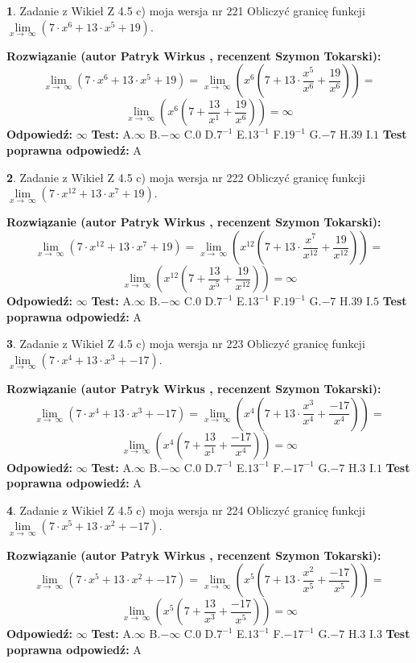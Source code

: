 \documentclass[12pt, a4paper]{article}
\theoremstyle{definition} %
\newtheorem{zad}{}
\newcommand{\zadStart}[1]{\begin{zad}#1\newline}
\newcommand{\zadStop}{\end{zad}}
\newcommand{\rozwStart}[2]{\noindent \textbf{Rozwiązanie (autor #1 , recenzent #2): }\newline}
\newcommand{\rozwStop}{\newline}
\newcommand{\odpStart}{\noindent \textbf{Odpowiedź:}\newline}
\newcommand{\odpStop}{\newline}
\newcommand{\testStart}{\noindent \textbf{Test:}\newline}
\newcommand{\testStop}{\newline}
\newcommand{\kluczStart}{\noindent \textbf{Test poprawna odpowiedź:}\newline}
\newcommand{\kluczStop}{\newline}
\begin{document}
\zadStart{Zadanie z Wikieł Z 4.5 c) moja wersja nr 221}
Obliczyć granicę funkcji  $\lim\limits_{x\to\ \infty}(7 \cdot x^{6}+13 \cdot x^{5}+19)$.
\zadStop
\rozwStart{Patryk Wirkus}{Szymon Tokarski}
$$\lim\limits_{x\to\ \infty}(7 \cdot x^{6}+13 \cdot x^{5}+19) = \lim\limits_{x\to\ \infty}(x^{6}(7 +13 \cdot \frac{x^{5}}{x^{6}}+\frac{19}{x^{6}})) =$$ $$\lim\limits_{x\to\ \infty}(x^{6}(7 +\frac{13}{x^{1}}+\frac{19}{x^{6}})) =\infty$$
\rozwStop
\odpStart
$\infty$
\odpStop
\testStart
A.$\infty$ B.$-\infty$ C.$0$ D.$7^{-1}$ E.$13^{-1}$
F.$19^{-1}$ G.$-7$
H.$39$
I.$1$
\testStop
\kluczStart
A
\kluczStop



\zadStart{Zadanie z Wikieł Z 4.5 c) moja wersja nr 222}
Obliczyć granicę funkcji  $\lim\limits_{x\to\ \infty}(7 \cdot x^{12}+13 \cdot x^{7}+19)$.
\zadStop
\rozwStart{Patryk Wirkus}{Szymon Tokarski}
$$\lim\limits_{x\to\ \infty}(7 \cdot x^{12}+13 \cdot x^{7}+19) = \lim\limits_{x\to\ \infty}(x^{12}(7 +13 \cdot \frac{x^{7}}{x^{12}}+\frac{19}{x^{12}})) =$$ $$\lim\limits_{x\to\ \infty}(x^{12}(7 +\frac{13}{x^{5}}+\frac{19}{x^{12}})) =\infty$$
\rozwStop
\odpStart
$\infty$
\odpStop
\testStart
A.$\infty$ B.$-\infty$ C.$0$ D.$7^{-1}$ E.$13^{-1}$
F.$19^{-1}$ G.$-7$
H.$39$
I.$5$
\testStop
\kluczStart
A
\kluczStop



\zadStart{Zadanie z Wikieł Z 4.5 c) moja wersja nr 223}
Obliczyć granicę funkcji  $\lim\limits_{x\to\ \infty}(7 \cdot x^{4}+13 \cdot x^{3}+-17)$.
\zadStop
\rozwStart{Patryk Wirkus}{Szymon Tokarski}
$$\lim\limits_{x\to\ \infty}(7 \cdot x^{4}+13 \cdot x^{3}+-17) = \lim\limits_{x\to\ \infty}(x^{4}(7 +13 \cdot \frac{x^{3}}{x^{4}}+\frac{-17}{x^{4}})) =$$ $$\lim\limits_{x\to\ \infty}(x^{4}(7 +\frac{13}{x^{1}}+\frac{-17}{x^{4}})) =\infty$$
\rozwStop
\odpStart
$\infty$
\odpStop
\testStart
A.$\infty$ B.$-\infty$ C.$0$ D.$7^{-1}$ E.$13^{-1}$
F.$-17^{-1}$ G.$-7$
H.$3$
I.$1$
\testStop
\kluczStart
A
\kluczStop



\zadStart{Zadanie z Wikieł Z 4.5 c) moja wersja nr 224}
Obliczyć granicę funkcji  $\lim\limits_{x\to\ \infty}(7 \cdot x^{5}+13 \cdot x^{2}+-17)$.
\zadStop
\rozwStart{Patryk Wirkus}{Szymon Tokarski}
$$\lim\limits_{x\to\ \infty}(7 \cdot x^{5}+13 \cdot x^{2}+-17) = \lim\limits_{x\to\ \infty}(x^{5}(7 +13 \cdot \frac{x^{2}}{x^{5}}+\frac{-17}{x^{5}})) =$$ $$\lim\limits_{x\to\ \infty}(x^{5}(7 +\frac{13}{x^{3}}+\frac{-17}{x^{5}})) =\infty$$
\rozwStop
\odpStart
$\infty$
\odpStop
\testStart
A.$\infty$ B.$-\infty$ C.$0$ D.$7^{-1}$ E.$13^{-1}$
F.$-17^{-1}$ G.$-7$
H.$3$
I.$3$
\testStop
\kluczStart
A
\kluczStop
\end{document}

